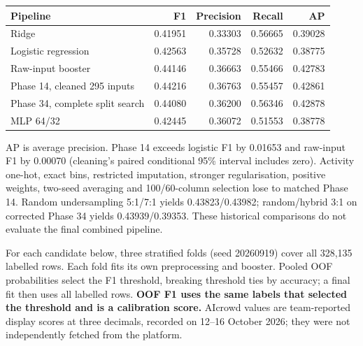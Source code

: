 \documentclass[10pt,a4paper]{article}
\newcommand{\heading}[1]{\vspace{5pt}{\large\bfseries #1}\par\vspace{2pt}}
\begin{document}
\heading{Historical nested development evidence}
\begin{center}
\small
\begin{tabularx}{\linewidth}{@{}Xrrrr@{}}
\toprule
Pipeline & F1 & Precision & Recall & AP \\
\midrule
Ridge & 0.41951 & 0.33303 & 0.56665 & 0.39028 \\
Logistic regression & 0.42563 & 0.35728 & 0.52632 & 0.38775 \\
Raw-input booster & 0.44146 & 0.36663 & 0.55466 & 0.42783 \\
Phase 14, cleaned 295 inputs & 0.44216 & 0.36763 & 0.55457 & 0.42861 \\
Phase 34, complete split search & 0.44080 & 0.36200 & 0.56346 & 0.42878 \\
MLP 64/32 & 0.42445 & 0.36072 & 0.51553 & 0.38778 \\
\bottomrule
\end{tabularx}
\end{center}
\vspace{-4pt}
AP is average precision. Phase 14 exceeds logistic F1 by 0.01653 and raw-input
F1 by 0.00070 (cleaning's paired conditional 95\% interval includes zero).
Activity one-hot, exact bins, restricted imputation, stronger regularisation,
positive weights, two-seed averaging and 100/60-column selection lose to matched
Phase 14. Random undersampling 5:1/7:1 yields 0.43823/0.43982; random/hybrid
3:1 on corrected Phase 34 yields 0.43939/0.39353. These historical comparisons
do not evaluate the final combined pipeline.

\newpage
\heading{Full-training calibration and AIcrowd selection}
For each candidate below, three stratified folds (seed 20260919) cover all
328,135 labelled rows. Each fold fits its own preprocessing and booster.
Pooled OOF probabilities select the F1 threshold, breaking threshold ties
by accuracy; a final fit then uses all labelled rows. \textbf{OOF F1 uses the
same labels that selected the threshold and is a calibration score.}
AIcrowd values are team-reported display scores at three decimals, recorded
on 12--16 October 2026; they were not independently fetched from the platform.
\end{document}
